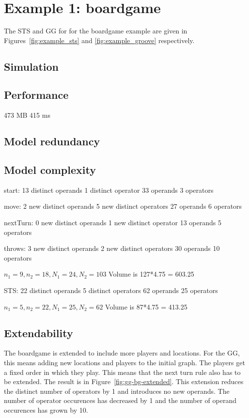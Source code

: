 \section{Example 1: boardgame}
The STS and GG for for the boardgame example are given in Figures~\ref{fig:example_sts} and \ref{fig:example_groove} respectively. 

\subsection{Simulation}

\subsection{Performance}
473 MB 415 ms

\subsection{Model redundancy}

\subsection{Model complexity}
start:
13 distinct operands
1 distinct operator
33 operands
3 operators

move:
2 new distinct operands
5 new distinct operators
27 operands
6 operators

nextTurn:
0 new distinct operands
1 new distinct operator
13 operands
5 operators

throws:
3 new distinct operands
2 new distinct operators
30 operands
10 operators

$n_1 = 9, n_2 = 18, N_1 = 24, N_2 = 103$ Volume is 127*4.75 = 603.25

STS:
22 distinct operands
5 distinct operators
62 operands
25 operators

$n_1 = 5, n_2 = 22, N_1 = 25, N_2 = 62$ Volume is 87*4.75 = 413.25


\subsection{Extendability}
The boardgame is extended to include more players and locations. For the GG, this means adding new locations and players to the initial graph. The players get a fixed order in which they play. This means that the next turn rule also has to be extended. The result is in Figure~\ref{fig:gg-bg-extended}. This extension reduces the distinct number of operators by 1 and introduces no new operands. The number of operator occurences has decreased by 1 and the number of operand occurences has grown by 10.

